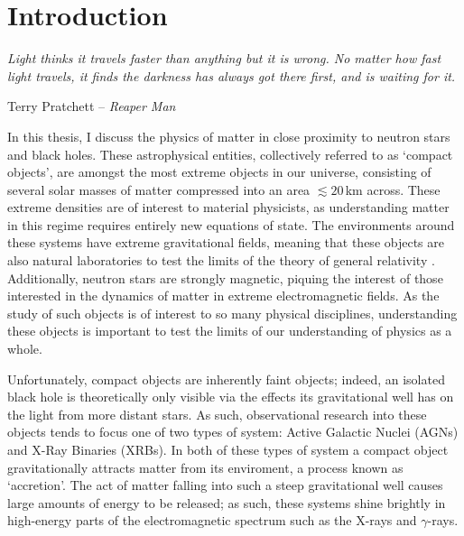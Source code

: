 \chapter{Introduction}

\epigraph{\textit{Light thinks it travels faster than anything but it is wrong. No matter how fast light travels, it finds the darkness has always got there first, and is waiting for it.}}{Terry Pratchett -- \textit{Reaper Man}}

\vspace{1cm}

\par\noindent In this thesis, I discuss the physics of matter in close proximity to neutron stars and black holes.  These astrophysical entities, collectively referred to as `compact objects',  are amongst the most extreme objects in our universe, consisting of several solar masses of matter compressed into an area $\lesssim20$\,km across.  These extreme densities are of interest to material physicists, as understanding matter in this regime requires entirely new equations of state.  The environments around these systems have extreme gravitational fields, meaning that these objects are also natural laboratories to test the limits of the theory of general relativity \citep{Einstein_GR}.  Additionally, neutron stars are strongly magnetic, piquing the interest of those interested in the dynamics of matter in extreme electromagnetic fields.  As the study of such objects is of interest to so many physical disciplines, understanding these objects is important to test the limits of our understanding of physics as a whole.
\par Unfortunately, compact objects are inherently faint objects; indeed, an isolated black hole is theoretically only visible via the effects its gravitational well has on the light from more distant stars.  As such, observational research into these objects tends to focus one of two types of system: Active Galactic Nuclei (AGNs) and X-Ray Binaries (XRBs).  In both of these types of system a compact object gravitationally attracts matter from its enviroment, a process known as `accretion'.  The act of matter falling into such a steep gravitational well causes large amounts of energy to be released; as such, these systems shine brightly in high-energy parts of the electromagnetic spectrum such as the X-rays and $\gamma$-rays.

